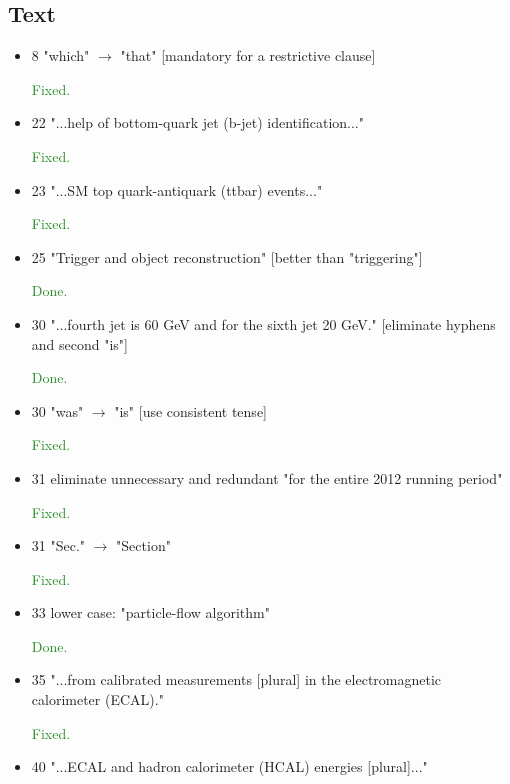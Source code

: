 \documentclass[paper=a4, fontsize=11pt]{scrartcl}
\begin{document}
\subsection{Text}
\begin{itemize}

\item 8 "which" $\rightarrow$  "that" [mandatory for a restrictive clause]

\textcolor{ForestGreen}{Fixed.}

\item 22 "...help of bottom-quark jet (b-jet) identification..."

\textcolor{ForestGreen}{Fixed.}

\item 23 "...SM top quark-antiquark (ttbar) events..."

\textcolor{ForestGreen}{Fixed.}

\item 25 "Trigger and object reconstruction"
 [better than "triggering"]
 
\textcolor{ForestGreen}{Done.}

\item 30 "...fourth jet is 60 GeV and for the sixth jet 20 GeV."
 [eliminate hyphens and second "is"]
 
\textcolor{ForestGreen}{Done.}

\item 30 "was" $\rightarrow$  "is" [use consistent tense]

\textcolor{ForestGreen}{Fixed.}

\item 31 eliminate unnecessary and redundant
 "for the entire 2012 running period"
 
\textcolor{ForestGreen}{Fixed.}

\item 31 "Sec." $\rightarrow$  "Section"

\textcolor{ForestGreen}{Fixed.}

\item 33 lower case: "particle-flow algorithm"

\textcolor{ForestGreen}{Done.}

\item 35 "...from calibrated measurements [plural] in the electromagnetic
  calorimeter (ECAL)."
  
\textcolor{ForestGreen}{Fixed.}

\item 40 "...ECAL and hadron calorimeter (HCAL) energies [plural]..."


\end{itemize}
\end{document}
